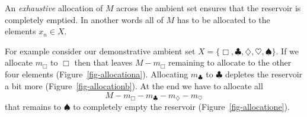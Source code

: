 \documentclass[
  letterpaper,
  DIV=11,
  numbers=noendperiod]{scrartcl}
\begin{document}
An \emph{exhaustive} allocation of \(M\) across the ambient set ensures
that the reservoir is completely emptied. In another words all of \(M\)
has to be allocated to the elements \(x_{n} \in X\).

For example consider our demonstrative ambient set
\(X = \{\Box, \clubsuit, \diamondsuit, \heartsuit, \spadesuit \}\). If
we allocate \(m_\Box\) to \(\Box\) then that leaves \(M - m_\Box\)
remaining to allocate to the other four elements
(Figure~\ref{fig-allocationa}). Allocating \(m_\clubsuit\) to
\(\clubsuit\) depletes the reservoir a bit more
(Figure~\ref{fig-allocationb}). At the end we have to allocate all \[
M - m_{\Box} - m_{\clubsuit} - m_{\diamondsuit} - m_{\heartsuit}
\] that remains to \(\spadesuit\) to completely empty the reservoir
(Figure~\ref{fig-allocatione}).

\begin{figure}

\begin{minipage}[t]{0.50\linewidth}

{\centering 


}

\subcaption{\label{fig-allocationa}}
\end{minipage}%
%
\begin{minipage}[t]{0.50\linewidth}

{\centering 

\raisebox{-\height}{

}}
\end{minipage}
\end{figure}
\end{document}
